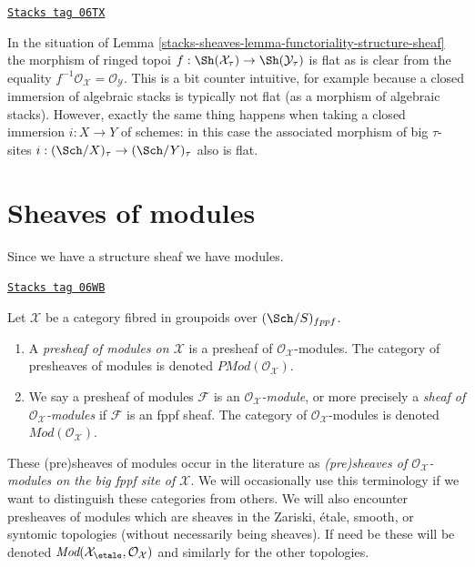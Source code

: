 \begin{remark}[Flat]
\label{stacks-sheaves-remark-flat}
\href{https://stacks.math.columbia.edu/tag/06TX}{\texttt{Stacks tag 06TX}}

In the situation of
Lemma \ref{stacks-sheaves-lemma-functoriality-structure-sheaf}
the morphism of ringed topoi
$f : \Sh(\mathcal{X}_\tau) \to \Sh(\mathcal{Y}_\tau)$
is flat as is clear from the equality
$f^{-1}\mathcal{O}_\mathcal{X} = \mathcal{O}_\mathcal{Y}$.
This is a bit counter intuitive, for example because a closed
immersion of algebraic stacks is typically not flat (as a morphism of
algebraic stacks).
However, exactly the same thing happens when taking a closed
immersion $i : X \to Y$ of schemes: in this case the associated
morphism of big $\tau$-sites
$i : (\Sch/X)_\tau \to (\Sch/Y)_\tau$
also is flat.
\end{remark}

\section{Sheaves of modules}
\label{stacks-sheaves-section-modules}
Since we have a structure sheaf we have modules.

\begin{definition}[Modules]
\label{stacks-sheaves-definition-modules}
\href{https://stacks.math.columbia.edu/tag/06WB}{\texttt{Stacks tag 06WB}}

Let $\mathcal{X}$ be a category fibred in groupoids over
$(\Sch/S)_{fppf}$.
\begin{enumerate}
\item A {\it presheaf of modules on $\mathcal{X}$} is a
presheaf of $\mathcal{O}_\mathcal{X}$-modules. The category of
presheaves of modules is denoted $\textit{PMod}(\mathcal{O}_\mathcal{X})$.
\item We say a presheaf of modules $\mathcal{F}$ is an
{\it $\mathcal{O}_\mathcal{X}$-module}, or more precisely a
{\it sheaf of $\mathcal{O}_\mathcal{X}$-modules} if $\mathcal{F}$
is an fppf sheaf. The category of $\mathcal{O}_\mathcal{X}$-modules
is denoted $\textit{Mod}(\mathcal{O}_\mathcal{X})$.
\end{enumerate}
\end{definition}

These (pre)sheaves of modules occur in the literature as {\it (pre)sheaves
of $\mathcal{O}_\mathcal{X}$-modules on the big fppf site of $\mathcal{X}$}.
We will occasionally use this terminology if we want to distinguish these
categories from others. We will also encounter presheaves of modules which
are sheaves in the Zariski, \'etale, smooth, or syntomic topologies
(without necessarily being sheaves). If need be these will be denoted
$\textit{Mod}(\mathcal{X}_\etale, \mathcal{O}_\mathcal{X})$
and similarly for the other topologies.

